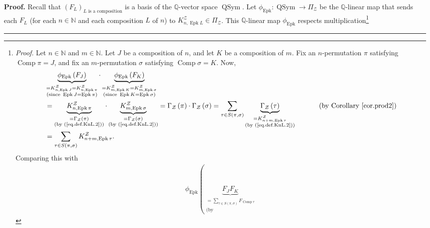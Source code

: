 \documentclass[numbers=enddot,12pt,final,onecolumn,notitlepage]{scrartcl}%
\theoremstyle{definition}
\newenvironment{proof}[1][Proof]{\noindent\textbf{#1.} }{\ \rule{0.5em}{0.5em}}
\let\sumnonlimits\sum
\renewcommand{\sum}{\sumnonlimits\limits}
\begin{document}
\begin{proof}
Recall that $\left(  F_{L}\right)  _{L\text{ is a composition}}$ is a basis of
the $\mathbb{Q}$-vector space $\operatorname*{QSym}$. Let $\phi
_{\operatorname*{Epk}}:\operatorname*{QSym}\rightarrow\Pi_{\mathcal{Z}}$ be
the $\mathbb{Q}$-linear map that sends each $F_{L}$ (for each $n\in\mathbb{N}$
and each composition $L$ of $n$) to $K_{n,\operatorname*{Epk}L}^{\mathcal{Z}%
}\in\Pi_{\mathcal{Z}}$. This $\mathbb{Q}$-linear map $\phi
_{\operatorname*{Epk}}$ respects multiplication\footnote{\textit{Proof.} Let
$n\in\mathbb{N}$ and $m\in\mathbb{N}$. Let $J$ be a composition of $n$, and
let $K$ be a composition of $m$. Fix an $n$-permutation $\pi$ satisfying
$\operatorname*{Comp}\pi=J$, and fix an $m$-permutation $\sigma$ satisfying
$\operatorname*{Comp}\sigma=K$. Now,%
\begin{align*}
&  \underbrace{\phi_{\operatorname*{Epk}}\left(  F_{J}\right)  }%
_{\substack{=K_{n,\operatorname*{Epk}J}^{\mathcal{Z}}=K_{n,\operatorname*{Epk}%
\pi}^{\mathcal{Z}}\\\text{(since }\operatorname*{Epk}J=\operatorname*{Epk}%
\pi\text{)}}}\cdot\underbrace{\phi_{\operatorname*{Epk}}\left(  F_{K}\right)
}_{\substack{=K_{m,\operatorname*{Epk}K}^{\mathcal{Z}}%
=K_{m,\operatorname*{Epk}\sigma}^{\mathcal{Z}}\\\text{(since }%
\operatorname*{Epk}K=\operatorname*{Epk}\sigma\text{)}}}\\
&  =\underbrace{K_{n,\operatorname*{Epk}\pi}^{\mathcal{Z}}}_{\substack{=\Gamma
_{\mathcal{Z}}\left(  \pi\right)  \\\text{(by (\ref{eq.def.KnL.2}))}}%
}\cdot\underbrace{K_{m,\operatorname*{Epk}\sigma}^{\mathcal{Z}}}%
_{\substack{=\Gamma_{\mathcal{Z}}\left(  \sigma\right)  \\\text{(by
(\ref{eq.def.KnL.2}))}}}=\Gamma_{\mathcal{Z}}\left(  \pi\right)  \cdot
\Gamma_{\mathcal{Z}}\left(  \sigma\right)  =\sum_{\tau\in S\left(  \pi
,\sigma\right)  }\underbrace{\Gamma_{\mathcal{Z}}\left(  \tau\right)
}_{\substack{=K_{n+m,\operatorname*{Epk}\tau}^{\mathcal{Z}}\\\text{(by
(\ref{eq.def.KnL.2}))}}}\ \ \ \ \ \ \ \ \ \ \left(  \text{by Corollary
\ref{cor.prod2}}\right) \\
&  =\sum_{\tau\in S\left(  \pi,\sigma\right)  }K_{n+m,\operatorname*{Epk}\tau
}^{\mathcal{Z}}.
\end{align*}
Comparing this with%
\begin{align*}
\phi_{\operatorname*{Epk}}\left(  \underbrace{F_{J}F_{K}}_{\substack{=\sum
_{\tau\in S\left(  \pi,\sigma\right)  }F_{\operatorname*{Comp}\tau}\\\text{(by
}}}
\end{align*}}
\end{proof}
\end{document}
